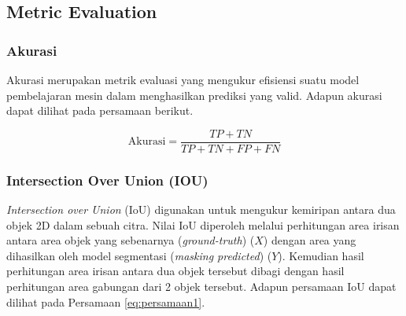 


\subsection{Metric Evaluation}
\subsubsection{Akurasi}
Akurasi merupakan metrik evaluasi yang mengukur efisiensi suatu model pembelajaran mesin dalam menghasilkan prediksi yang valid. Adapun akurasi dapat dilihat pada persamaan berikut. 

\begin{equation}
	\text{Akurasi} = \frac{TP + TN}{TP + TN + FP + FN}
\end{equation}

\subsubsection{Intersection Over Union (IOU)}
\textit{Intersection over Union} (IoU) digunakan untuk mengukur kemiripan antara dua objek 2D dalam sebuah citra\cite{rezatofighi2019generalized}. Nilai IoU diperoleh melalui perhitungan area irisan antara area objek yang sebenarnya (\textit{ground-truth}) ($X$) dengan area yang dihasilkan oleh model segmentasi (\textit{masking predicted}) ($Y$). Kemudian hasil perhitungan area irisan antara dua objek tersebut dibagi dengan hasil perhitungan area gabungan dari 2 objek tersebut. Adapun persamaan IoU dapat dilihat pada Persamaan \ref{eq:persamaan1}. 

